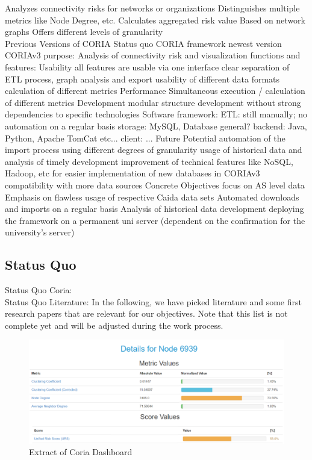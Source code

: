 \documentclass[conference]{IEEEtran}
\begin{document}
Analyzes connectivity risks for networks or organizations 
Distinguishes multiple metrics like Node Degree, etc.
Calculates aggregated risk value
Based on network graphs
Offers different levels of granularity\\

Previous Versions of CORIA
Status quo CORIA framework	
newest version CORIAv3
purpose: Analysis of connectivity risk and visualization 
functions and features:
Usability
all features are usable via one interface 
clear separation of ETL process, graph analysis and export
usability of different data formats
calculation of different metrics 
Performance	
Simultaneous execution / calculation of different metrics
Development
modular structure
development without strong dependencies to specific technologies
Software framework:
ETL: still manually; no automation on a regular basis
storage: MySQL, Database general? 
backend: Java, Python,  Apache TomCat etc...
client: ...
Future Potential
automation of the import process
using different degrees of granularity
usage of historical data and analysis of timely development 
improvement of technical features like NoSQL, Hadoop, etc for easier implementation of new databases in CORIAv3
compatibility with more data sources
Concrete Objectives
focus on AS level data
Emphasis on flawless usage of respective Caida data sets
Automated downloads and imports on a regular basis
Analysis of historical data development
deploying the framework on a permanent uni server (dependent on the confirmation for the university’s server) 




\subsection{Status Quo}
Status Quo Coria: \\

Status Quo Literature:
In the following, we have picked literature and some first research papers that are relevant for our objectives. Note that this list is not complete yet and will be adjusted during the work process.


\begin{figure}[htbp]
\centerline{\includegraphics[scale=0.4]{Graphics/coriaExtract.PNG}}
\caption{Extract of Coria Dashboard}
\label{fig}
\end{figure}
\end{document}

